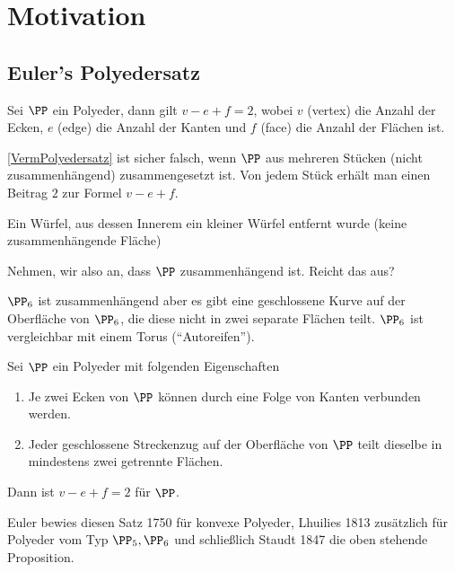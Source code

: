 \section{Motivation}

\subsection{Euler's Polyedersatz}
\label{subsec:0.1}

\begin{prop}[Vermutung]
\label{VermPolyedersatz}
Sei $\PP$ ein Polyeder, dann gilt $v-e+f =2$, wobei $v$ (vertex) die Anzahl der Ecken, $e$
(edge) die Anzahl der Kanten und $f$ (face) die Anzahl der Flächen ist.\fishhere
\end{prop}

\ref{VermPolyedersatz} ist sicher falsch, wenn $\PP$  aus mehreren
Stücken (nicht zusammenhängend) zusammengesetzt ist. Von jedem Stück erhält man
einen Beitrag $2$ zur Formel $v-e+f$.

\begin{bspn}
Ein Würfel, aus dessen Innerem ein kleiner Würfel entfernt wurde (keine
zusammenhängende Fläche)\bsphere
\end{bspn}

Nehmen, wir also an, dass $\PP$ zusammenhängend ist. Reicht das aus?

\begin{bspn}
$\PP_6$ ist zusammenhängend aber es gibt eine geschlossene Kurve auf der
Oberfläche von $\PP_6$, die diese nicht in zwei separate Flächen teilt. $\PP_6$
ist vergleichbar mit einem Torus (``Autoreifen'').\bsphere
\end{bspn}

\begin{prop}
\label{prop:Polyedersatz}
Sei $\PP$ ein Polyeder mit folgenden Eigenschaften
\begin{enumerate}
  \item Je zwei Ecken von $\PP$ können durch eine Folge von Kanten verbunden
  werden.
  \item Jeder geschlossene Streckenzug auf der Oberfläche von $\PP$ teilt
  dieselbe in mindestens zwei getrennte Flächen.
\end{enumerate}
Dann ist $v-e+f=2$ für $\PP$.\fishhere
\end{prop}   
Euler bewies diesen Satz 1750 für konvexe Polyeder, Lhuilies 1813 zusätzlich
für Polyeder vom Typ $\PP_5,\PP_6$ und schließlich Staudt 1847 die oben
stehende Proposition.

